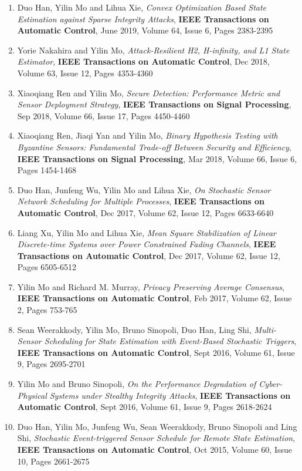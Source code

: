 \documentclass[10pt, a4paper]{article}
\begin{document}
\begin{enumerate}
\item Duo Han, Yilin Mo and Lihua Xie, {\emph{Convex Optimization Based State Estimation against Sparse Integrity Attacks}}, \textbf{IEEE Transactions on Automatic Control}, June 2019, Volume 64, Issue 6, Pages 2383-2395
\item Yorie Nakahira and Yilin Mo, \emph{Attack-Resilient H2, H-infinity, and L1 State Estimator}, \textbf{IEEE Transactions on Automatic Control}, Dec 2018, Volume 63, Issue 12, Pages 4353-4360
\item Xiaoqiang Ren and Yilin Mo, \emph{Secure Detection: Performance Metric and Sensor Deployment Strategy}, \textbf{IEEE Transactions on Signal Processing}, Sep 2018, Volume 66, Issue 17, Pages 4450-4460
\item Xiaoqiang Ren, Jiaqi Yan and Yilin Mo, {\emph{Binary Hypothesis Testing with Byzantine Sensors: Fundamental Trade-off Between Security and Efficiency}}, \textbf{IEEE Transactions on Signal Processing}, Mar 2018, Volume 66, Issue 6, Pages 1454-1468
\item Duo Han, Junfeng Wu, Yilin Mo and Lihua Xie, \emph{On Stochastic Sensor Network Scheduling for Multiple Processes}, \textbf{IEEE Transactions on Automatic Control}, Dec 2017, Volume 62, Issue 12, Pages 6633-6640
\item Liang Xu, Yilin Mo and Lihua Xie, \emph{Mean Square Stabilization of Linear Discrete-time Systems over Power Constrained Fading Channels}, \textbf{IEEE Transactions on Automatic Control}, Dec 2017, Volume 62, Issue 12, Pages 6505-6512
\item Yilin Mo and Richard M. Murray, {\emph{Privacy Preserving Average Consensus}}, \textbf{IEEE Transactions on Automatic Control}, Feb 2017, Volume 62, Issue 2, Pages 753-765
\item Sean Weerakkody, Yilin Mo, Bruno Sinopoli, Duo Han, Ling Shi, \emph{Multi-Sensor Scheduling for State Estimation with Event-Based Stochastic Triggers}, \textbf{IEEE Transactions on Automatic Control}, Sept 2016, Volume 61, Issue 9, Pages 2695-2701
\item Yilin Mo and Bruno Sinopoli, {\emph{On the Performance Degradation of Cyber-Physical Systems under Stealthy Integrity Attacks}}, \textbf{IEEE Transactions on Automatic Control}, Sept 2016, Volume 61, Issue 9, Pages 2618-2624
\item Duo Han, Yilin Mo, Junfeng Wu, Sean Weerakkody, Bruno Sinopoli and Ling Shi, {\emph{Stochastic Event-triggered Sensor Schedule for Remote State Estimation}}, \textbf{IEEE Transactions on Automatic Control}, Oct 2015, Volume 60, Issue 10, Pages 2661-2675

\end{enumerate}
\end{document}
